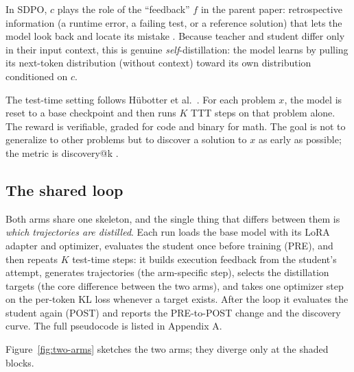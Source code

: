 In SDPO, \(c\) plays the role of the ``feedback'' \(f\) in the parent paper: retrospective information (a runtime error, a failing test, or a reference solution) that lets the model look back and locate its mistake \cite{r1}. Because teacher and student differ only in their input context, this is genuine \emph{self}-distillation: the model learns by pulling its next-token distribution (without context) toward its own distribution conditioned on \(c\).

The test-time setting follows Hübotter et al.~\cite{r1}. For each problem \(x\), the model is reset to a base checkpoint and then runs \(K\) TTT steps on that problem alone. The reward is verifiable, graded for code and binary for math. The goal is not to generalize to other problems but to discover a solution to \(x\) as early as possible; the metric is discovery@k \cite{r1}.

\subsection{The shared loop}\label{the-shared-loop}

Both arms share one skeleton, and the single thing that differs between them is \emph{which trajectories are distilled}. Each run loads the base model with its LoRA adapter and optimizer, evaluates the student once before training (PRE), and then repeats \(K\) test-time steps: it builds execution feedback from the student's attempt, generates trajectories (the arm-specific step), selects the distillation targets (the core difference between the two arms), and takes one optimizer step on the per-token KL loss whenever a target exists. After the loop it evaluates the student again (POST) and reports the PRE-to-POST change and the discovery curve. The full pseudocode is listed in Appendix A.

Figure~\ref{fig:two-arms} sketches the two arms; they diverge only at the shaded blocks.

